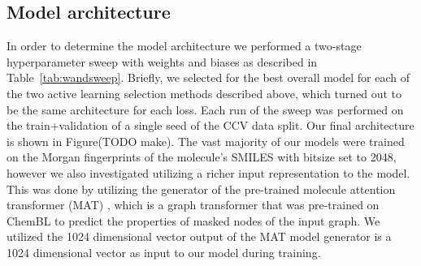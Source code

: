 \documentclass[journal=jmcmar,manuscript=article]{achemso}
\begin{document}
\subsection{Model architecture}
In order to determine the model architecture we performed a two-stage hyperparameter sweep with weights and biases\cite{wandb} as described in Table~\ref{tab:wandsweep}. Briefly, we selected for the best overall model for each of the two active learning selection methods described above, which turned out to be the same architecture for each loss. Each run of the sweep was performed on the train+validation of a single seed of the CCV data split. Our final architecture is shown in Figure(TODO make). The vast majority of our models were trained on the Morgan fingerprints of the molecule's SMILES with bitsize set to 2048, however we also investigated utilizing a richer input representation to the model. This was done by utilizing the generator of the pre-trained molecule attention transformer (MAT) \cite{MAT}, which is a graph transformer that was pre-trained on ChemBL\cite{Chembl} to predict the properties of masked nodes of the input graph. We utilized the 1024 dimensional vector output of the MAT model generator is a 1024 dimensional vector as input to our model during training.
\end{document}
